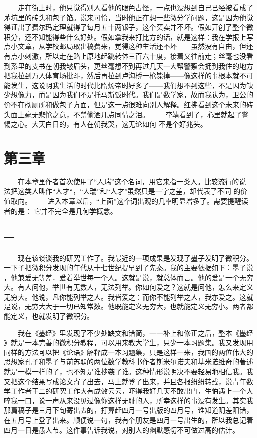  　　走在街上时，他只觉得别人看他的眼色古怪，一点也没想到自己已经被看成了 茅坑里的砖头和包子馅。说来可怜，当时他正在想一些微分学问题，这是因为他觉 得证出了费尔玛定理就得了每月五十两银子，这个买卖并不坏。假如开创了整个微 积分，还不知能得些什么好处。假如拿我来打比方的话，就是这样：我在学报上写 点小文章，从学校邮局取出稿费来，觉得这种生活还不坏——虽然没有自由，但还 有点小刺激，所以走在路上原地起跳转体三百六十度，接着又往前走；丝毫也没看 到系里的支书在朝我皱眉头，更丝毫想不到再过几天一大帮警察会拥到我住的地方 把我拉到万人体育场批斗，然后再拉到卢沟桥一枪毙掉——像这样的事根本就不可 能发生，这说明我生活的时代比隋炀帝时好多了——我们想不到这些，不是因为缺 少想像力，而是因为我们不是托马斯饭时代。我们是数学家，故而我认为，卫公的 价不在砌厕所和做包子方面，但是这一点很难向别人解释。红拂看到这个未来的砖 头面上毫无悲怆之意，不禁偷洒几点同情之泪。 　　李靖看到了，心里就起了警惕之心。大天白日的，有人在朝我哭，这无论如何 不是个好兆头。 
 
 

\section{第三章} 
 
 　　在本章里作者首次使用了“人瑞”这个名词，用它来指一类人。比较流行的说 法把这类人叫作“人才“，“人瑞”和“人才”虽然只是一字之差，却代表了不同 的价值取向。 　　进入本章以后，“上面”这个词出观的几率明显增多了。需要提醒读者的是： 它并不完全是几何学概念。 
 
 
\subsection{一} 
 
 　　现在该谈谈我的研究工作了。我最近的一项成果是发现了墨子发明了微积分。 一下子把微积分发现的年代从十七世纪提早到了先秦。我的主要依据如下：墨子说 ，他兼爱无等差．爱着举世每一个人。这就是说，就总体而言。他的爱是一个无穷 大。有人问他，举世有无数人，无法列举。你如何爱之？这就是问他，怎么来定义 无穷大。他说，凡你能列举之人。我皆爱之：而你不能列举之人，我亦爱之。这就 是说，无穷大大于一切已知常数。他既能定义无穷大，也就能定义无穷小。两者都 能定义，也就发明了微积分。

 　　我在《墨经》里发现了不少处缺文和错简，一一补上和修正之后，整本《墨经 》就是一本完善的微积分教程，可以用来教大学生，只少一本习题集。我又发现用 同样的方法可以把《论语》解释成一本习题集，只是这样一来，我国的两位伟大的 思想家孔子和墨子与前苏联的两位数学教科书作者斯米尔诺夫和基米诺维奇的著述 就是一模一样的了，也不知是谁抄袭了谁。这种情形说明决不要轻易地相信我。我 又把这个结果写成论文寄了出去，马上就登了出来，并且各报纷纷转载，说青年数 学工作者王二的研究工作大有成效云云，吓得我好几天不敢出门，生怕遇上一个人 啐我一口，说一声从来没见过像你这样无耻的人，所幸这样的事没有发生。其实我 那篇稿子是三月下旬寄出去的，打算赶四月一号出版的四月号，谁知道阴差阳错， 在五月号上登了出来。顺便说一句，我有个朋友是四月一号出生的，所以我总记着 四月一日是愚人节。这件事告诉我说，对别人的幽默感切不可做过高的估计。

